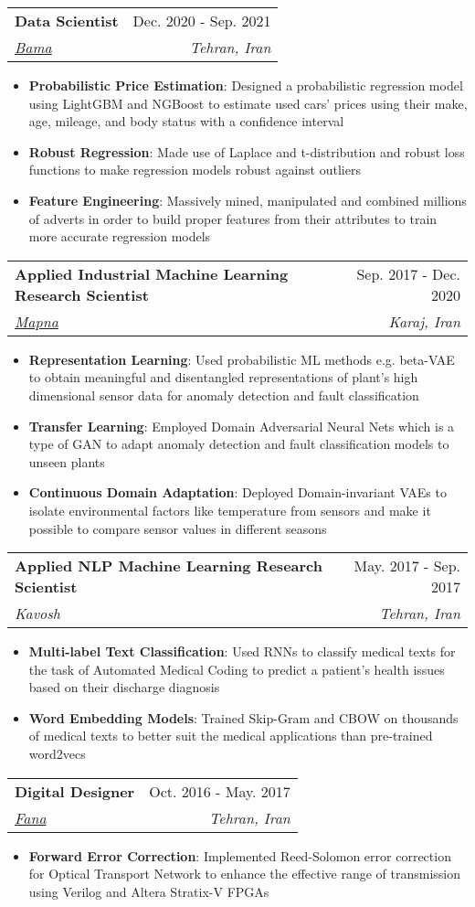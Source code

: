 \documentclass[letterpaper,11pt]{article}
\makeatletter
\newcommand{\resumeItem}[2]{
  \item\small{
    \textbf{#1}{: #2 \vspace{-2pt}}
  }
}
\newcommand{\resumeSubheading}[4]{
  \vspace{-1pt}\item
    \begin{tabular*}{0.97\textwidth}[t]{l@{\extracolsep{\fill}}r}
      \textbf{#1} & #2 \\
      \textit{\small#3} & \textit{\small #4} \\
    \end{tabular*}\vspace{-5pt}
}
\newcommand{\resumeItemListStart}{\begin{itemize}}
\newcommand{\resumeItemListEnd}{\end{itemize}\vspace{-5pt}}
\makeatother
\begin{document}
    \resumeSubheading
      {Data Scientist}{Dec. 2020 - Sep. 2021}
      {\href{https://bama.ir}{Bama}}{Tehran, Iran}
      \resumeItemListStart
        \resumeItem{Probabilistic Price Estimation}
          {Designed a probabilistic regression model using LightGBM and NGBoost to estimate used cars' prices using their make, age, mileage, and body status with a confidence interval}
        \resumeItem{Robust Regression}
          {Made use of Laplace and t-distribution and robust loss functions to make regression models robust against outliers}
        \resumeItem{Feature Engineering}
          {Massively mined, manipulated and combined millions of adverts in order to build proper features from their attributes to train more accurate regression models}
      \resumeItemListEnd

    \resumeSubheading
      {Applied Industrial Machine Learning Research Scientist}{Sep. 2017 - Dec. 2020}
      {\href{https://mapnagroup.com/?lang=en}{Mapna}}{Karaj, Iran}
        \resumeItemListStart
          \resumeItem{Representation Learning}
          {Used probabilistic ML methods e.g. beta-VAE to obtain meaningful and disentangled representations of plant's high dimensional sensor data for anomaly detection and fault classification}
          \resumeItem{Transfer Learning}
          {Employed Domain Adversarial Neural Nets which is a type of GAN to adapt anomaly detection and fault classification models to unseen plants}
          \resumeItem{Continuous Domain Adaptation}
          {Deployed Domain-invariant VAEs to isolate environmental factors like temperature from sensors and make it possible to compare sensor values in different seasons}                 
        \resumeItemListEnd

    \resumeSubheading
      {Applied NLP Machine Learning Research Scientist}{May. 2017 - Sep. 2017}
      {Kavosh}{Tehran, Iran}
      \resumeItemListStart
        \resumeItem{Multi-label Text Classification}
          {Used RNNs to classify medical texts for the task of Automated Medical Coding to predict a patient's health issues based on their discharge diagnosis}
        \resumeItem{Word Embedding Models}
          {Trained Skip-Gram and CBOW on thousands of medical texts to better suit the medical applications than pre-trained word2vecs}
      \resumeItemListEnd

    \resumeSubheading
      {Digital Designer}{Oct. 2016 - May. 2017}
      {\href{http://www.fananet.com/indexEn.html}{Fana}}{Tehran, Iran}
      \resumeItemListStart
        \resumeItem{Forward Error Correction}
          {Implemented Reed-Solomon error correction for Optical Transport Network to enhance the effective range of transmission using Verilog and Altera Stratix-V FPGAs}
      \resumeItemListEnd
\end{document}
